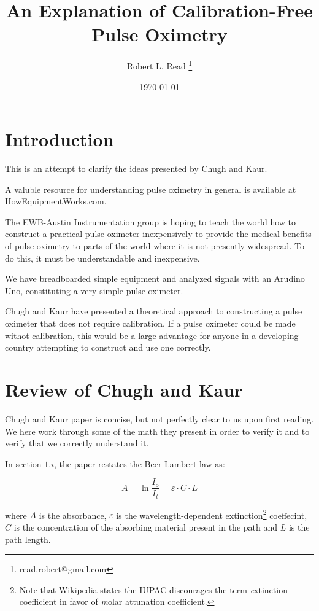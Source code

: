 \documentclass[11pt]{article}
\title{An Explanation of Calibration-Free Pulse Oximetry}
\author{Robert L. Read
  \thanks{read.robert@gmail.com}
}
\affil{Founder, Public Invention, an educational non-profit.}
\date{\today}
\begin{document}
\maketitle


\section{Introduction}

This is an attempt to clarify the ideas presented by Chugh and Kaur\cite{ChughAndKaur2015}.

A valuble resource for understanding pulse oximetry in general is available at HowEquipmentWorks.com\cite{howPulseOx}.

The EWB-Austin Instrumentation group is hoping to teach the world how to construct a practical pulse oximeter inexpensively to provide
the medical benefits of pulse oximetry to parts of the world where it is not presently widespread. To do this, it must be understandable
and inexpensive.

We have breadboarded simple equipment and analyzed signals with an Arudino Uno, constituting a very simple pulse oximeter.

Chugh and Kaur\cite{ChughAndKaur2015} have presented a theoretical approach to constructing a pulse oximeter that does not require calibration.
If a pulse oximeter could be made withot calibration, this would be a large advantage for anyone in a developing country attempting to construct
and use one correctly.

\section{Review of Chugh and Kaur}

Chugh and Kaur\cite{ChughAndKaur2015} paper is concise, but not perfectly clear to us upon first reading. We here work through some of the
math they present in order to verify it and to verify that we correctly understand it.

In section $1.i$, the paper restates the Beer-Lambert law\cite{wiki:Beer-Lambert} as:

\begin{equation}
  A = \ln \frac{I_o}{I_t} = \varepsilon \cdot C \cdot L
  \end{equation}

where $A$ is the absorbance, $\varepsilon$ is the wavelength-dependent extinction\footnote{Note that Wikipedia\cite{wiki:MolarAttenuation} states the IUPAC discourages the
term {\emph extinction coefficient} in favor of {\emph molar attunation coefficient}.}
coeffecint, $C$ is the concentration of the absorbing material present in the
path and $L$ is the path length.
\end{document}
